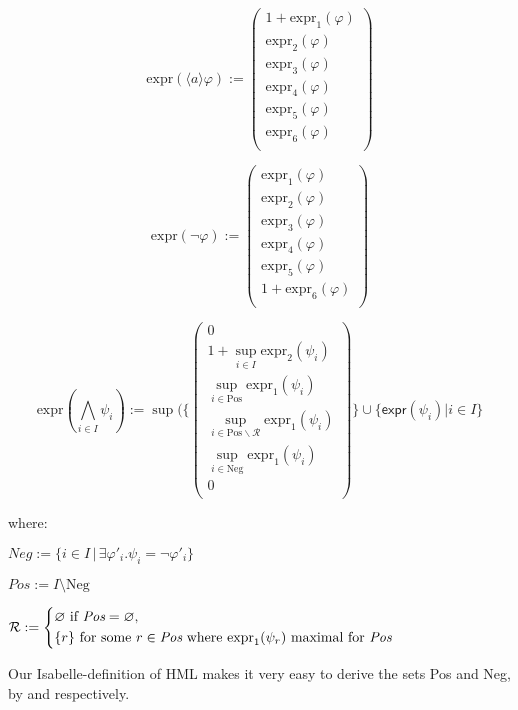\begin{isabellebody}
\begin{isamarkuptext}
\[
\text{expr}(\langle a \rangle \varphi) :=
\begin{pmatrix}
1 + \text{expr}_1(\varphi) \\
\text{expr}_2(\varphi) \\
\text{expr}_3(\varphi) \\
\text{expr}_4(\varphi) \\
\text{expr}_5(\varphi) \\
\text{expr}_6(\varphi) \\
\end{pmatrix}
\]

\[
\text{expr}(\neg \varphi) := 
\begin{pmatrix}
\text{expr}_1(\varphi) \\
\text{expr}_2(\varphi) \\
\text{expr}_3(\varphi) \\
\text{expr}_4(\varphi) \\
\text{expr}_5(\varphi) \\
1 + \text{expr}_6(\varphi) \\
\end{pmatrix}
\]

\[
\text{expr}\left( \bigwedge_{i \in I} \psi_i \right) := \sup(\{
\begin{pmatrix}
0 \\
1 + \sup_{i \in I} \text{expr}_2(\psi_i) \\
\sup_{i \in \text{Pos}} \text{expr}_1(\psi_i) \\
\sup_{i \in \text{Pos} \backslash \mathcal{R}} \text{expr}_1(\psi_i) \\
\sup_{i \in \text{Neg}} \text{expr}_1(\psi_i) \\
0 \\
\end{pmatrix} \} \cup \{\textsf{expr}(\psi_i) | i \in I\} 
\]

where:

$\textit{Neg} := \{i \in I \, | \, \exists \varphi'_i. \psi_i = \neg \varphi'_i\}$

$\textit{Pos} := I \setminus \text{Neg}$

$\mathcal{R} := \left\{
\begin{aligned}
&\varnothing \text{ if } \textit{Pos} = \varnothing, \\
&\{ r \} \text{ for some } r \in \textit{Pos} \text{ where } \text{expr}_1(\psi_r) \text{ maximal for \textit{Pos}}
\end{aligned}
\right.$

Our Isabelle-definition of HML makes it very easy to derive the sets Pos and Neg, by  and  respectively.


\end{isamarkuptext}
\end{isabellebody}
